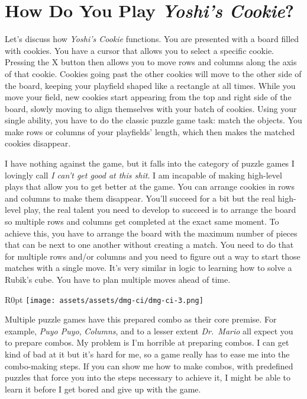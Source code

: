 \documentclass{book}
\begin{document}
\FloatBarrier\needspace{10mm}\section*{How Do You Play \emph{Yoshi’s Cookie}?}\nopagebreak[4]

Let’s discuss how \emph{Yoshi’s Cookie} functions. You are presented with a board filled with cookies. You have a cursor that allows you to select a specific cookie. Pressing the X button then allows you to move rows and columns along the axis of that cookie. Cookies going past the other cookies will move to the other side of the board, keeping your playfield shaped like a rectangle at all times. While you move your field, new cookies start appearing from the top and right side of the board, slowly moving to align themselves with your batch of cookies. Using your single ability, you have to do the classic puzzle game task: match the objects. You make rows or columns of your playfields’ length, which then makes the matched cookies disappear.

I have nothing against the game, but it falls into the category of puzzle games I lovingly call \emph{I can’t get good at this shit}. I am incapable of making high-level plays that allow you to get better at the game. You can arrange cookies in rows and columns to make them disappear. You’ll succeed for a bit but the real high-level play, the real talent you need to develop to succeed is to arrange the board so multiple rows and columns get completed at the exact same moment. To achieve this, you have to arrange the board with the maximum number of pieces that can be next to one another without creating a match. You need to do that for multiple rows and/or columns and you need to figure out a way to start those matches with a single move. It’s very similar in logic to learning how to solve a Rubik’s cube. You have to plan multiple moves ahead of time.

\begin{wrapfigure}{R}{0pt} \texttt{[image: assets/assets/dmg-ci/dmg-ci-3.png]}\end{wrapfigure}
Multiple puzzle games have this prepared combo as their core premise. For example, \emph{Puyo Puyo}, \emph{Columns}, and to a lesser extent \emph{Dr. Mario} all expect you to prepare combos. My problem is I’m horrible at preparing combos. I can get kind of bad at it but it’s hard for me, so a game really has to ease me into the combo-making steps. If you can show me how to make combos, with predefined puzzles that force you into the steps necessary to achieve it, I might be able to learn it before I get bored and give up with the game.
\end{document}

